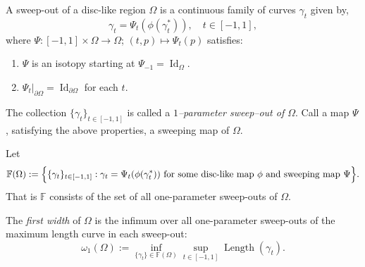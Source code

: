 \begin{definition}
A sweep-out of a disc-like region $\Omega$ is a continuous family of curves $\gamma_t$ given by, 
\begin{equation}
\gamma_t = \Psi_t(\phi(\gamma^*_t)), \quad t\in[-1,1],
\end{equation}
where $\Psi: [-1,1]\times\Omega \to \Omega$; $(t,p) \mapsto \Psi_t(p)$ satisfies:
\begin{enumerate}
    \item $\Psi$ is an isotopy starting at $\Psi_{-1} = \operatorname{Id}_{\Omega}$.
    \item $\Psi_t|_{\partial\Omega} = \operatorname{Id}_{\partial\Omega}$ for each $t$.
\end{enumerate}
The collection $\{\gamma_{t}\}_{t\in[-1,1]}$ is called a \emph{$1$–parameter sweep–out of $\Omega$}. Call a map $\Psi$, satisfying the above properties, a sweeping map of $\Omega$. 
\end{definition}

\begin{definition}
Let
\begin{align*}
\mathbb{F}(\Omega):=\Bigl\{\{\gamma_t\}_{t\in[-1,1]}: \gamma_t = \Psi_t(\phi(\gamma_t^{*})) \text{ for some disc-like map } \phi \text{ and sweeping map } \Psi \Bigr\}.
\end{align*}
That is $\mathbb{F}$ consists of the set of all one-parameter sweep-outs of $\Omega$. 
\end{definition}

\begin{definition}
The \emph{first width} of $\Omega$ is the infimum over all one-parameter sweep-outs of the maximum length curve in each sweep-out:
\begin{equation}
\omega_{1}(\Omega) := \inf_{\{\gamma_t\}\in \mathbb{F}(\Omega)} \sup_{{t\in[-1,1]}} \operatorname{Length}(\gamma_{t}).    
\end{equation}
\end{definition}

